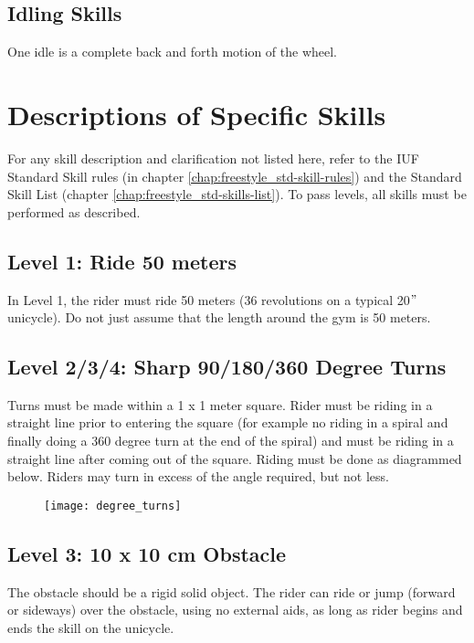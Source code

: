 \subsection{Idling Skills}
One idle is a complete back and forth motion of the wheel.

\section{Descriptions of Specific Skills}
For any skill description and clarification not listed here, refer to the IUF Standard Skill rules (in chapter \ref{chap:freestyle_std-skill-rules}) and the Standard Skill List (chapter \ref{chap:freestyle_std-skills-list}).
To pass levels, all skills must be performed as described.

\subsection{Level 1: Ride 50 meters}
In Level 1, the rider must ride 50 meters (36 revolutions on a typical 20$"$ unicycle).
Do not just assume that the length around the gym is 50 meters.

\subsection{Level 2/3/4: Sharp 90/180/360 Degree Turns}
Turns must be made within a 1 x 1 meter square.
Rider must be riding in a straight line prior to entering the square (for example no riding in a spiral and finally doing a 360 degree turn at the end of the spiral) and must be riding in a straight line after coming out of the square.
Riding must be done as diagrammed below.
Riders may turn in excess of the angle required, but not less.

\begin{figure}[h]
\begin{center}
\texttt{[image: degree\_turns]}
\end{center}
\vspace{-20pt}
\vspace{-10pt}
\end{figure}
 
\subsection{Level 3: 10 x 10 cm Obstacle}
The obstacle should be a rigid solid object.
The rider can ride or jump (forward or sideways) over the obstacle, using no external aids, as long as rider begins and ends the skill on the unicycle.


